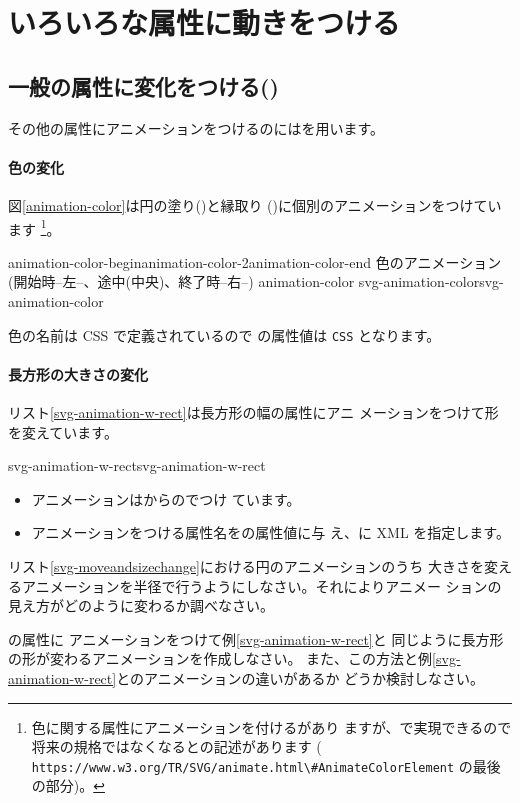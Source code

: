 \section{いろいろな属性に動きをつける}
\subsection{一般の属性に変化をつける()}\label{animationbyanimate}
その他の属性にアニメーションをつけるのにはを用います。
\paragraph{色の変化}
\hspace{-0.5em}図\ref{animation-color}は円の塗り()と縁取り
()に個別のアニメーションをつけています
\footnote{色に関する属性にアニメーションを付けるがあり
ますが、で実現できるので
将来の規格ではなくなるとの記述があります
(%
{\Verb+https://www.w3.org/TR/SVG/animate.html\#AnimateColorElement+}
の最後の部分)。}。

{{animation-color-begin}{animation-color-2}{animation-color-end}}
{色のアニメーション(開始時--左--、途中(中央)、終了時--右--)}
{animation-color}
{svg-animation-color}{svg-animation-color}

色の名前は CSS で定義されているので  の属性値は
\texttt{CSS} となります。%

\paragraph{長方形の大きさの変化}
リスト\ref{svg-animation-w-rect}は長方形の幅の属性にアニ
メーションをつけて形を変えています。

{svg-animation-w-rect}{svg-animation-w-rect}
\begin{itemize}
 \item アニメーションはからのでつけ
       ています。
 \item アニメーションをつける属性名をの属性値に与
       え、に XML を指定します。
\end{itemize}
\begin{Problem}\upshape
 リスト\ref{svg-moveandsizechange}における円のアニメーションのうち
大きさを変えるアニメーションを半径で行うようにしなさい。それによりアニメー
 ションの見え方がどのように変わるか調べなさい。
\end{Problem}
\begin{Problem}\upshape{}の属性に
 アニメーションをつけて例\ref{svg-animation-w-rect}と
 同じように長方形の形が変わるアニメーションを作成しなさい。
また、この方法と例\ref{svg-animation-w-rect}とのアニメーションの違いがあるか
 どうか検討しなさい。
\end{Problem}
\ifSeminor
\else

